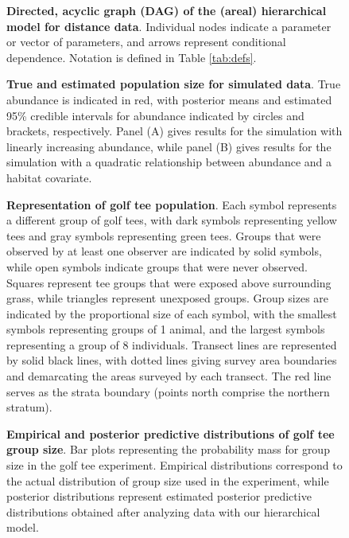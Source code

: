\documentclass[10pt]{article}
\begin{document}
\begin{figure}
\caption{{\bf Directed, acyclic graph (DAG) of the (areal) hierarchical model
for distance data}. Individual nodes indicate a parameter or vector of parameters, and arrows represent conditional dependence. Notation is defined in Table \ref{tab:defs}.}
\label{fig:DAG}
\end{figure}

\begin{figure}
\caption{{\bf True and estimated population size for simulated data}. True abundance is indicated in red, with posterior means and estimated 95\% credible intervals for abundance indicated by circles and brackets, respectively.  Panel (A) gives results for the simulation with linearly increasing abundance, while panel (B) gives results for the simulation with a quadratic relationship between abundance and a habitat covariate.}
\label{fig:sim_N}
\end{figure}

\begin{figure}
\caption{{\bf Representation of golf tee population}. Each symbol represents a different group of golf tees, with dark symbols representing yellow tees and gray symbols representing green tees.  Groups that were observed by at least one observer are indicated by solid symbols, while open symbols indicate groups that were never observed.  Squares represent tee groups that were exposed above surrounding grass, while triangles represent unexposed groups.
Group sizes are indicated by the proportional size of each symbol, with the smallest symbols representing groups of 1 animal, and the largest symbols representing a group of 8 individuals.  Transect lines are represented by solid black lines, with dotted lines giving survey area boundaries and demarcating the areas surveyed by each transect.  The red line serves as the strata boundary (points north comprise the northern stratum).}
\label{fig:tee_landscape}
\end{figure}

\begin{figure}
\caption{{\bf Empirical and posterior predictive distributions of golf tee group size}. Bar plots representing the probability mass for group size in the golf tee experiment.  Empirical distributions correspond to the actual distribution of group size used in the experiment, while posterior distributions represent estimated posterior predictive distributions obtained after analyzing data with our hierarchical model.}
\label{fig:tee_group}
\end{figure}
\end{document}
